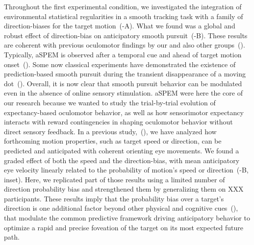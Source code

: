 \documentclass[profile,final,english, draft]{article}%
\newcommand{\citep}[1]{(\cite{#1})}
\begin{document}
Throughout the first experimental condition,
we investigated the integration of environmental statistical regularities
in a smooth tracking task with
a family of direction-biases for the target motion~(-A).
What we found was a global and robust effect of direction-bias
on anticipatory smooth pursuit~(-B).
These results are coherent with previous oculomotor findings
by our and also other groups~\citep{Montagnini2010, SantosKowler2017}.
Typically, aSPEM is observed after a temporal cue and
ahead of target motion onset~\citep{KowlerSteinman1979a,KowlerSteinman1979b, KowlerSteinman1984}.
Some now classical experiments have demonstrated the existence of prediction-based smooth pursuit during
the transient disappearance of a moving dot~\citep{Badler2006,BeckerFuchs1985}.
Overall, it is now clear that smooth pursuit behavior
can be modulated even in the absence of online sensory stimulation.
aSPEM were here the core of our research because
we wanted to study the trial-by-trial evolution
of expectancy-based oculomotor behavior,
as well as how sensorimotor expectancy interacts
with reward contingencies in shaping oculomotor behavior without direct sensory feedback.
In a previous study,~\citep{SoutoMontagniniMasson2008, Montagnini2010},
we have analyzed how forthcoming motion properties,
such as target speed or direction, can be
predicted and anticipated with coherent orienting eye movements.
We found a graded effect of both the speed and the direction-bias,
with mean anticipatory eye velocity
linearly related to the probability of motion's speed or direction~(-B, inset).
Here, we replicated part of those results
using a limited number of direction probability bias and
strengthened them by generalizing them on XXX participants.
These results imply that the probability bias over a target's direction is
one additional factor beyond other physical and cognitive cues~\citep{Kowler2014, SantosKowler2017},
that modulate the common predictive framework
driving anticipatory behavior to optimize a rapid and
precise foveation of the target on its most expected future path.

\end{document}
